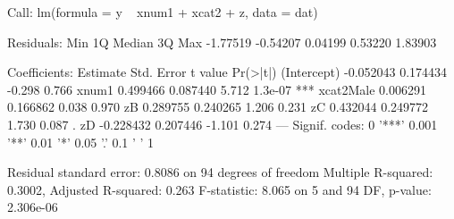 \begin{Schunk}
\begin{Soutput}
Call:
lm(formula = y ~ xnum1 + xcat2 + z, data = dat)

Residuals:
     Min       1Q   Median       3Q      Max 
-1.77519 -0.54207  0.04199  0.53220  1.83903 

Coefficients:
             Estimate Std. Error t value Pr(>|t|)    
(Intercept) -0.052043   0.174434  -0.298    0.766    
xnum1        0.499466   0.087440   5.712  1.3e-07 ***
xcat2Male    0.006291   0.166862   0.038    0.970    
zB           0.289755   0.240265   1.206    0.231    
zC           0.432044   0.249772   1.730    0.087 .  
zD          -0.228432   0.207446  -1.101    0.274    
---
Signif. codes:  0 '***' 0.001 '**' 0.01 '*' 0.05 '.' 0.1 ' ' 1

Residual standard error: 0.8086 on 94 degrees of freedom
Multiple R-squared:  0.3002,	Adjusted R-squared:  0.263 
F-statistic: 8.065 on 5 and 94 DF,  p-value: 2.306e-06
\end{Soutput}
\end{Schunk}
